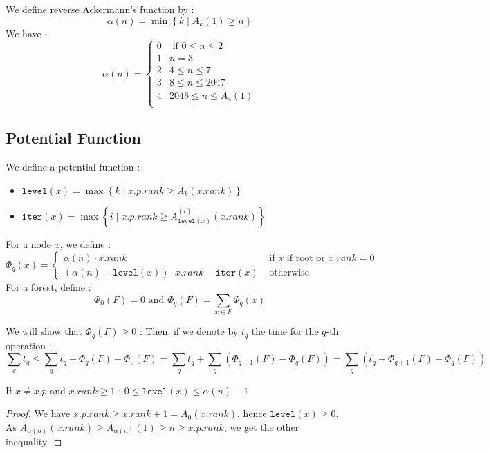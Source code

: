 \documentclass{cours}
\begin{document}
\begin{definition}
    We define reverse Ackermann's function by :
    \[
        \alpha(n) = \min \left\{k \mid A_{k}(1) \geq n\right\}
    \]
    We have :
    \[
        \alpha(n) = \begin{cases}
            0 & \text{ if } 0 \leq n \leq 2 \\
            1 & n = 3                       \\
            2 & 4 \leq n \leq 7             \\
            3 & 8 \leq n \leq 2047          \\
            4 & 2048 \leq n \leq A_{4}(1)   \\
        \end{cases}
    \]
\end{definition}

\subsection{Potential Function}
We define a potential function :
\begin{definition}
    \begin{itemize}
        \item $\texttt{level}(x) = \max \left\{k \mid x.p.rank \geq A_{k}(x.rank)\right\}$
        \item $\texttt{iter}(x) = \max \left\{i \mid x.p.rank \geq A_{\texttt{level}(x)}^{(i)}(x.rank)\right\}$
    \end{itemize}
    For a node $x$, we define :
    \[
        \Phi_{q}(x) = \begin{cases}
            \alpha(n)\cdot x.rank                                                       & \text{ if $x$ if root or } x.rank = 0 \\
            \left(\alpha(n) - \texttt{level}(x)\right)  \cdot x.rank - \texttt{iter}(x) & \text{ otherwise}
        \end{cases}
    \]
    For a forest, define :
    \[
        \Phi_{0}(F) = 0 \text{ and } \Phi_{q}(F) = \sum_{x \in F} \Phi_{q}(x)
    \]
\end{definition}

We will show that $\Phi_{q}(F) \geq 0$ :
Then, if we denote by $t_{q}$ the time for the $q$-th operation :
\[
    \sum_{q} t_{q} \leq \sum_{q} t_{q} + \Phi_{q}(F) - \Phi_{0}(F) = \sum_{q}t_{q} + \sum_{q}\left(\Phi_{q + 1}(F) - \Phi_{q}(F)\right) = \sum_{q}\left(t_{q} + \Phi_{q + 1}(F) - \Phi_{q}(F)\right)
\]

\begin{lemma}
    If $x \neq x.p$ and $x.rank \geq 1$ : $0 \leq \texttt{level}(x) \leq \alpha(n) - 1$
\end{lemma}
\begin{proof}
    We have $x.p.rank \geq x.rank + 1 = A_{0}(x.rank)$, hence $\texttt{level}(x) \geq 0$.\\
    As $A_{\alpha(n)}(x.rank) \geq A_{\alpha(n)}(1) \geq n \geq x.p.rank$, we get the other inequality.
\end{proof}
\end{document}
